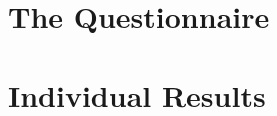 \documentclass[
pdfa=false,  %
color=9c,
logo=body,
class=article,
marginpar=false,
logofile=../logos/tuda_logo.pdf
]{tudapub}
\begin{document}
\newpage
\begin{appendices}
	\section{The Questionnaire}
		\label{appendix:questionnaire}
		
	\newpage
	\section{Individual Results}
		\label{appendix:individual_results}
		
\end{appendices}
\end{document}
